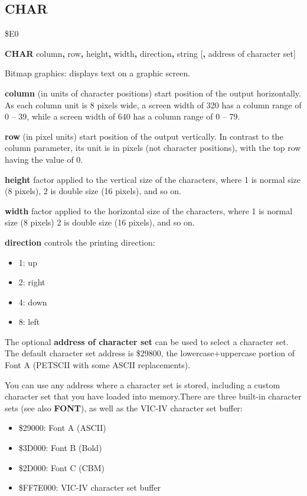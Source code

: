 \subsection{CHAR}
\begin{description}[leftmargin=2cm,style=nextline]
\item [Token:]   \$E0

\item [Format:]  {\bf CHAR} column{\bf,} row{\bf,} height{\bf,} width{\bf,} direction{\bf,} string [{\bf,} address of character set]

\item [Usage:]   Bitmap graphics: displays text on a graphic screen.

                 {\bf column} (in units of character positions) start position of the output horizontally. As each column unit is 8 pixels wide, a screen width of 320 has a column range of 0 -- 39, while a screen width of 640 has a column range of 0 -- 79.

                 {\bf row} (in pixel units) start position of the output vertically. In contrast to the column parameter, its unit is in pixels (not character positions), with the top row having the value of 0.

                 {\bf height} factor applied to the vertical size of the characters, where 1 is normal size (8 pixels), 2 is double size (16 pixels), and so on.

                 {\bf width} factor applied to the horizontal size of the characters, where 1 is normal size (8 pixels) 2 is double size (16 pixels), and so on.

                 {\bf direction} controls the printing direction:
                 \begin{itemize}
                    \item 1: up
                    \item 2: right
                    \item 4: down
                    \item 8: left
                 \end{itemize}

                 The optional {\bf address of character set} can be used to select a character set. The default character set address is \$29800, the lowercase+uppercase portion of Font A (PETSCII with some ASCII replacements).

                 You can use any address where a character set is stored, including a custom character set that you have loaded into memory.There are three built-in character sets (see also {\bf FONT}), as well as the VIC-IV character set buffer:
                 \begin{itemize}
                    \item \$29000: Font A (ASCII)
                    \item \$3D000: Font B (Bold)
                    \item \$2D000: Font C (CBM)
                    \item \$FF7E000: VIC-IV character set buffer
                 \end{itemize}


\end{description}
